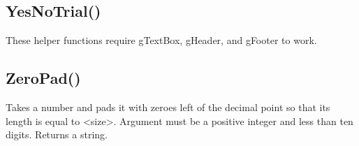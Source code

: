 \documentclass[letterpaper,10pt,english]{sphinxmanual}
\begin{document}
\ignorespaces 

\subsection{YesNoTrial()}
\label{\detokenize{reference/utility:yesnotrial}}\label{\detokenize{reference/utility:index-45}}
\sphinxAtStartPar
{}

\sphinxAtStartPar
These helper functions require gTextBox, gHeader, and gFooter to work.

\sphinxAtStartPar
{}

\begin{sphinxVerbatim}[commandchars=\\\{\}]
\end{sphinxVerbatim}

\ignorespaces 

\subsection{ZeroPad()}
\label{\detokenize{reference/utility:zeropad}}\label{\detokenize{reference/utility:index-46}}
\sphinxAtStartPar
{}

\sphinxAtStartPar
{}

\sphinxAtStartPar
Takes a number and pads it with zeroes left of the   decimal point so that its length is equal to \textless{}size\textgreater{}. Argument must   be a positive integer and less than ten digits.  Returns a string.

\sphinxAtStartPar
{}

\begin{sphinxVerbatim}[commandchars=\\\{\}]
\end{sphinxVerbatim}

\sphinxAtStartPar
{}

\begin{sphinxVerbatim}[commandchars=\\\{\}]
\end{sphinxVerbatim}
\end{document}
